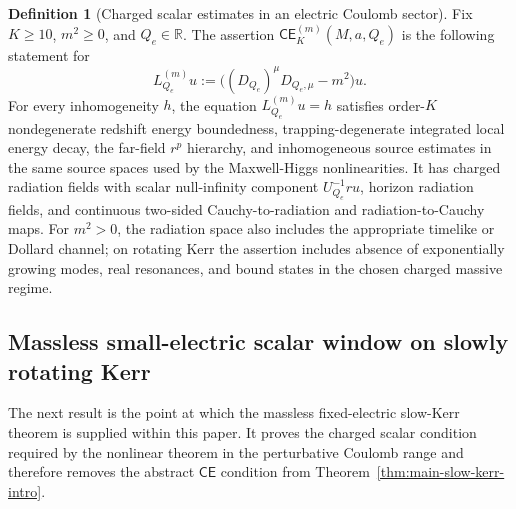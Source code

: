 \documentclass[11pt]{article}
\numberwithin{equation}{section}
\theoremstyle{plain}
\theoremstyle{definition}
\newtheorem{definition}{Definition}[section]
\theoremstyle{remark}
\newcommand{\CElec}{\mathsf{CE}}
\begin{document}
\begin{definition}[Charged scalar estimates in an electric Coulomb sector]\label{def:external-electric-condition}
Fix \(K\ge10\), \(m^2\ge0\), and \(Q_e\in\mathbb R\).  The assertion \(\CElec^{(m)}_K(M,a,Q_e)\) is the following statement for
\begin{equation}
 L_{Q_e}^{(m)}u:=\bigl((D_{Q_e})^\mu D_{Q_e,\mu}-m^2\bigr)u.
\end{equation}
For every inhomogeneity \(h\), the equation \(L_{Q_e}^{(m)}u=h\) satisfies order-\(K\) nondegenerate redshift energy boundedness, trapping-degenerate integrated local energy decay, the far-field \(r^p\) hierarchy, and inhomogeneous source estimates in the same source spaces used by the Maxwell-Higgs nonlinearities.  It has charged radiation fields with scalar null-infinity component \(U_{Q_e}^{-1}ru\), horizon radiation fields, and continuous two-sided Cauchy-to-radiation and radiation-to-Cauchy maps.  For \(m^2>0\), the radiation space also includes the appropriate timelike or Dollard channel; on rotating Kerr the assertion includes absence of exponentially growing modes, real resonances, and bound states in the chosen charged massive regime.
\end{definition}



\subsection{Massless small-electric scalar window on slowly rotating Kerr}\label{subsec:small-electric-window}

The next result is the point at which the massless fixed-electric slow-Kerr theorem is supplied within this paper.  It proves the charged scalar condition required by the nonlinear theorem in the perturbative Coulomb range and therefore removes the abstract \(\CElec\) condition from Theorem~\ref{thm:main-slow-kerr-intro}.
\end{document}
